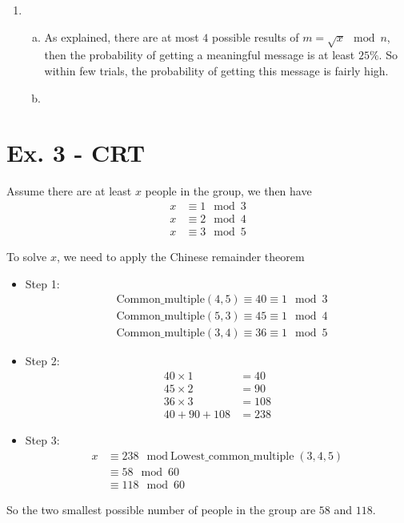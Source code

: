 \documentclass[11pt,a4paper]{article}
\begin{document}
\begin{enumerate}
    \item
    \begin{enumerate}[a)]
        \item As explained, there are at most $4$ possible results of $m = \sqrt{x} \mod n$, then the probability of getting a meaningful message is at least $25\%$. So within few trials, the probability of getting this message is fairly high.

        \item
    \end{enumerate}

\end{enumerate}

\section*{Ex. 3 - CRT}
\par Assume there are at least $x$ people in the group, we then have
	\begin{align*}
		x &\equiv 1 \mod 3 \\
		x &\equiv 2 \mod 4 \\
		x &\equiv 3 \mod 5
	\end{align*}
\par To solve $x$, we need to apply the Chinese remainder theorem
	\begin{itemize}
		\item Step 1:
			\begin{align*}
				&\mbox{Common\_multiple}(4, 5) \equiv 40 \equiv 1 \mod 3 \\
				&\mbox{Common\_multiple}(5, 3) \equiv 45 \equiv 1 \mod 4 \\
				&\mbox{Common\_multiple}(3, 4) \equiv 36 \equiv 1 \mod 5
			\end{align*}

		\item Step 2:
			\begin{align*}
				40 \times 1 &= 40 \\
				45 \times 2 &= 90 \\
				36 \times 3 &= 108 \\
				40 + 90 + 108 &= 238
			\end{align*}

		\item Step 3:
			\begin{align*}
				x &\equiv 238 \mod \mbox{Lowest\_common\_multiple} (3, 4 , 5) \\
				&\equiv 58 \mod 60 \\
				&\equiv 118 \mod 60
			\end{align*}
	\end{itemize}
\par So the two smallest possible number of people in the group are $58$ and $118$.
\end{document}
